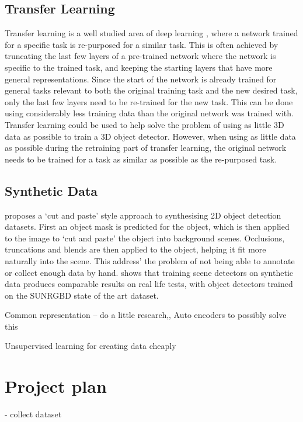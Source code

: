 \documentclass[11pt]{article}
\begin{document}
\subsection*{Transfer Learning}
Transfer learning is a well studied area of deep learning \cite{DeCAF}\cite{survery_on_transfer}\cite{how_transferable}, where a network trained for a specific task is re-purposed for a similar task. This is often achieved by truncating the last few layers of a pre-trained network where the network is specific to the trained task, and keeping the starting layers that have more general representations. Since the start of the network is already trained for general tasks relevant to both the original training task and the new desired task, only the last few layers need to be re-trained for the new task. This can be done using considerably less training data than the original network was trained with. Transfer learning could be used to help solve the problem of using as little 3D data as possible to train a 3D object detector. However, when using as little data as possible during the retraining part of transfer learning, the original network needs to be trained for a task as similar as possible as the re-purposed task.

\subsection*{Synthetic Data}
\cite{cut_paste} proposes a `cut and paste' style approach to synthesising 2D object detection datasets. First an object mask is predicted for the object, which is then applied to the image to `cut and paste' the object into background scenes. Occlusions, truncations and blends are then applied to the object, helping it fit more naturally into the scene. This address' the problem of not being able to annotate or collect enough data by hand. \cite{synthetic_train} shows that training scene detectors on synthetic data produces comparable results on real life tests, with object detectors trained on the SUNRGBD state of the art dataset.

Common representation -- do a little research,,
	Auto encoders to possibly solve this 

Unsupervised learning for creating data cheaply


\section{Project plan}

- collect dataset
\end{document}
